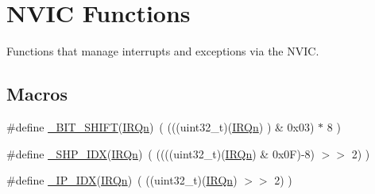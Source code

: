 \hypertarget{group___c_m_s_i_s___core___n_v_i_c_functions}{}\section{N\+V\+IC Functions}
\label{group___c_m_s_i_s___core___n_v_i_c_functions}


Functions that manage interrupts and exceptions via the N\+V\+IC.  


\subsection*{Macros}
\begin{DoxyCompactItemize}
\item 
\#define \mbox{\hyperlink{group___c_m_s_i_s___core___n_v_i_c_functions_ga53c75b28823441c6153269f0ecbed878}{\+\_\+\+B\+I\+T\+\_\+\+S\+H\+I\+FT}}(\mbox{\hyperlink{group___s_a_m_d21_e15_a__cmsis_ga666eb0caeb12ec0e281415592ae89083}{I\+R\+Qn}})~(  (((uint32\+\_\+t)(\mbox{\hyperlink{group___s_a_m_d21_e15_a__cmsis_ga666eb0caeb12ec0e281415592ae89083}{I\+R\+Qn}})       )    \&  0x03) $\ast$ 8 )
\item 
\#define \mbox{\hyperlink{group___c_m_s_i_s___core___n_v_i_c_functions_gaee4f7eb5d7e770ad51489dbceabb1755}{\+\_\+\+S\+H\+P\+\_\+\+I\+DX}}(\mbox{\hyperlink{group___s_a_m_d21_e15_a__cmsis_ga666eb0caeb12ec0e281415592ae89083}{I\+R\+Qn}})~( ((((uint32\+\_\+t)(\mbox{\hyperlink{group___s_a_m_d21_e15_a__cmsis_ga666eb0caeb12ec0e281415592ae89083}{I\+R\+Qn}}) \& 0x0\+F)-\/8) $>$$>$    2)     )
\item 
\#define \mbox{\hyperlink{group___c_m_s_i_s___core___n_v_i_c_functions_ga370ec4b1751a6a889d849747df3763a9}{\+\_\+\+I\+P\+\_\+\+I\+DX}}(\mbox{\hyperlink{group___s_a_m_d21_e15_a__cmsis_ga666eb0caeb12ec0e281415592ae89083}{I\+R\+Qn}})~(   ((uint32\+\_\+t)(\mbox{\hyperlink{group___s_a_m_d21_e15_a__cmsis_ga666eb0caeb12ec0e281415592ae89083}{I\+R\+Qn}})            $>$$>$    2)     )
\end{DoxyCompactItemize}

